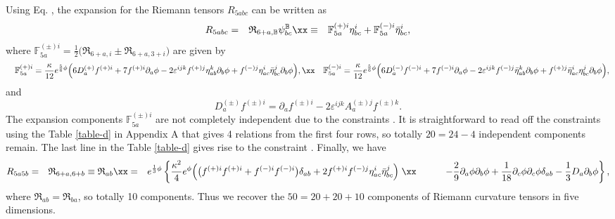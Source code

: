 \documentclass[12pt,epsf]{article}
\begin{document}
Using Eq. , the expansion  for the Riemann tensors $R_{5abc}$ can be written as
\begin{eqnarray} \label{rdecom-5abc}
  R_{5abc} &=& \mathfrak{R}_{6+a, \mathbb{B}} \psi^\mathbb{B}_{bc} \xx
   &\equiv& \mathbb{F}^{(+)i}_{5a} \eta^i_{bc}  + \mathbb{F}^{(-)i}_{5a} \bar{\eta}^i_{bc},
\end{eqnarray}
where $\mathbb{F}^{(\pm)i}_{5a} = \frac{1}{2} \big(\mathfrak{R}_{6+a, i} \pm \mathfrak{R}_{6+a, 3+i} \big)$ are given by
\begin{eqnarray} \label{rf-5a}
  &&  \mathbb{F}^{(+)i}_{5a} = \frac{\kappa}{12} e^{\frac{5}{6} \phi} \Big( 6 D_a^{(+)} f^{(+)i}
  + 7 f^{(+)i} \partial_a \phi - 2 \varepsilon^{ijk} f^{(+)j} \eta^k_{ab} \partial_b \phi
  + f^{(-)j}\eta^i_{ac} \bar{\eta}^j_{bc} \partial_b \phi \Big), \xx
  &&  \mathbb{F}^{(-)i}_{5a} = \frac{\kappa}{12} e^{\frac{5}{6} \phi} \Big( 6 D_a^{(-)} f^{(-)i}
  + 7 f^{(-)i} \partial_a \phi - 2 \varepsilon^{ijk} f^{(-)j} \bar{\eta}^k_{ab} \partial_b \phi
  + f^{(+)j}\bar{\eta}^i_{ac} \eta^j_{bc} \partial_b \phi \Big),
\end{eqnarray}
and
\begin{equation}\label{cov-u1f}
  D_a^{(\pm)} f^{(\pm)i} = \partial_a f^{(\pm)i} - 2 \varepsilon^{ijk} A_a^{(\pm)j} f^{(\pm)k}.
\end{equation}
The expansion components $\mathbb{F}^{(\pm)i}_{5a}$ are not completely independent
due to the constraints . It is straightforward to read off the constraints
using the Table \ref{table-d} in Appendix A that gives 4 relations from the first four rows,
so totally $20=24-4$ independent components remain.
The last line in the Table \ref{table-d} gives rise to the constraint .
Finally, we have
\begin{eqnarray} \label{rdecom-5a5b}
  R_{5a5b} &=& \mathfrak{R}_{6+a, 6+b} \equiv \mathfrak{R}_{ab} \xx
  &=& e^{\frac{1}{3} \phi} \left\{ \frac{\kappa^2}{4} e^\phi \Big( \big( f^{(+)i} f^{(+)i} + f^{(-)i} f^{(-)i} \big) \delta_{ab}
  + 2 f^{(+)i} f^{(-)j} \eta^i_{ac} \bar{\eta}^j_{bc} \Big) \right. \xx
  && \left. \qquad - \frac{2}{9} \partial_a \phi \partial_b \phi + \frac{1}{18} \partial_c \phi \partial_c \phi \delta_{ab}
  - \frac{1}{3} D_a \partial_b \phi \right\},
\end{eqnarray}
where $\mathfrak{R}_{ab} = \mathfrak{R}_{ba}$, so totally 10 components. Thus we recover the $50 = 20 + 20 + 10$ components
of Riemann curvature tensors in five dimensions.
\end{document}
